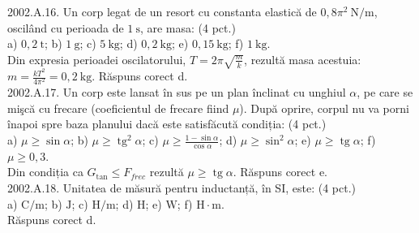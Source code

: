 2002.A.16. Un corp legat de un resort cu constanta elastică de $0,8 \pi^{2} \mathrm{~N} / \mathrm{m}$, oscilând cu perioada de $1 \mathrm{~s}$, are masa: (4 pct.)\\ a) $0,2 \mathrm{~t}$; b) $1 \mathrm{~g}$; c) $5 \mathrm{~kg}$; d) $0,2 \mathrm{~kg}$; e) $0,15 \mathrm{~kg}$; f) $1 \mathrm{~kg}$.\\ Din expresia perioadei oscilatorului, $T=2 \pi \sqrt{\frac{m}{k}}$, rezultă masa acestuia:\\ $m=\frac{k T^{2}}{4 \pi^{2}}=0,2 \mathrm{~kg}$. Răspuns corect d.\\

2002.A.17. Un corp este lansat în sus pe un plan înclinat cu unghiul $\alpha$, pe care se mişcă cu frecare (coeficientul de frecare fiind $\mu$). După oprire, corpul nu va porni înapoi spre baza planului dacă este satisfăcută condiția: (4 pct.)\\ a) $\mu \geq \sin \alpha$; b) $\mu \geq \operatorname{tg}^{2} \alpha$; c) $\mu \geq \frac{1-\sin \alpha}{\cos \alpha}$; d) $\mu \geq \sin ^{2} \alpha$; e) $\mu \geq \operatorname{tg} \alpha$; f) $\mu \geq 0,3$.\\ Din condiția ca $G_{\tan} \leq F_{frec}$ rezultă $\mu \geq \operatorname{tg} \alpha$. Răspuns corect e.\\

2002.A.18. Unitatea de măsură pentru inductanță, în SI, este: (4 pct.)\\ a) $\mathrm{C} / \mathrm{m}$; b) $\mathrm{J}$; c) $\mathrm{H} / \mathrm{m}$; d) $\mathrm{H}$; e) $\mathrm{W}$; f) $\mathrm{H} \cdot \mathrm{m}$.\\ Răspuns corect d.\\
